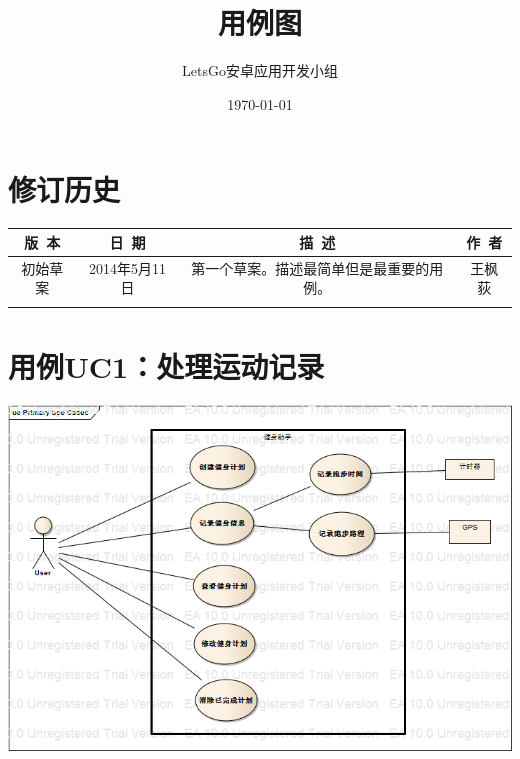 \documentclass [a4paper,11pt]{article}
\title{用例图}
\date{\today}
\author{LetsGo安卓应用开发小组}
\begin{document}
	
\maketitle
\section*{修订历史}

\begin{table}[!hbp]
\centering

\begin{tabular*}{\textwidth}{c|c|c|c}
\hline
\rule{0pt}{0.8cm}
版~本 & 日~期 & 描~述 & 作~者\\
\hline
\rule{0pt}{0.6cm}
初始草案 & 2014年5月11日 & 第一个草案。描述最简单但是最重要的用例。 & 王枫荻\\
\hline
\rule{0pt}{0.6cm}
 &  &  & \\
\hline
\end{tabular*}

\end{table}

\section*{用例UC1：处理运动记录}
\includegraphics[width=\textwidth]{big.png}

  
\end{document}
